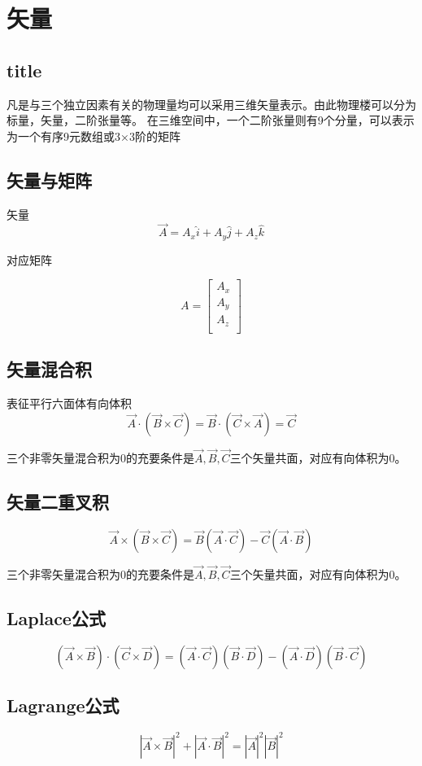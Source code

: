 \chapter{矢量}
\section{title}

凡是与三个独立因素有关的物理量均可以采用三维矢量表示。由此物理楼可以分为标量，矢量，二阶张量等。
在三维空间中，一个二阶张量则有9个分量，可以表示为一个有序9元数组或3×3阶的矩阵
\section{矢量与矩阵}


矢量
\[\overrightarrow{A}=A_x\widehat{i}+A_y\widehat{j}+A_z\widehat{k}\]

对应矩阵

\[A=\left[ \begin{array}{c}
A_x\\
A_y\\
A_z\\
\end{array} \right] \]

\section{矢量混合积}
表征平行六面体有向体积
\[
\vec{A}\cdot \left( \vec{B}\times \vec{C} \right) =\vec{B}\cdot \left( \vec{C}\times \vec{A} \right) =\vec{C}
\]

\begin{newdef}[]
	三个非零矢量混合积为0的充要条件是$\vec{A},\vec{B},\vec{C}$三个矢量共面，对应有向体积为0。
\end{newdef}




\section{矢量二重叉积}	
\[
\vec{A}\times \left( \vec{B}\times \vec{C} \right) =\vec{B}\left( \vec{A}\cdot \vec{C} \right) -\vec{C}\left( \vec{A}\cdot \vec{B} \right) 
\]
\begin{newdef}[]
	三个非零矢量混合积为0的充要条件是$\vec{A},\vec{B},\vec{C}$三个矢量共面，对应有向体积为0。
\end{newdef}



\section{Laplace公式}
\[
\left( \vec{A}\times \vec{B} \right) \cdot \left( \vec{C}\times \vec{D} \right) =\left( \vec{A}\cdot \vec{C} \right) \left( \vec{B}\cdot \vec{D} \right) -\left( \vec{A}\cdot \vec{D} \right) \left( \vec{B}\cdot \vec{C} \right) 
\]
\section{Lagrange公式}
\[
\left| \vec{A}\times \vec{B} \right|^2+\left| \vec{A}\cdot \vec{B} \right|^2=\left| \vec{A} \right|^2\left| \vec{B} \right|^2
\]



